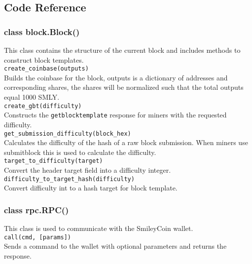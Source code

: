 \newpage

\subsection{Code Reference}

\subsubsection{class block.Block()}

This class contains the structure of the current block and includes methods to construct block templates. \\

\texttt{create\_coinbase(outputs)} \\

Builds the coinbase for the block, outputs is a dictionary of addresses and corresponding shares, the shares will be normalized such that the total outputs equal 1000 SMLY. \\

\texttt{create\_gbt(difficulty)} \\

Constructs the \texttt{getblocktemplate} response for miners with the requested difficulty. \\

\texttt{get\_submission\_difficulty(block\_hex)} \\

Calculates the difficulty of the hash of a raw block submission. When miners use submitblock this is used to calculate the difficulty. \\

\texttt{target\_to\_difficulty(target)}\\

Convert the header target field into a difficulty integer. \\

\texttt{difficulty\_to\_target\_hash(difficulty)}\\

Convert difficulty int to a hash target for block template. \\

\subsubsection{class rpc.RPC()}

This class is used to communicate with the SmileyCoin wallet. \\

\texttt{call(cmd, [params])}\\

Sends a command to the wallet with optional parameters and returns the response.
